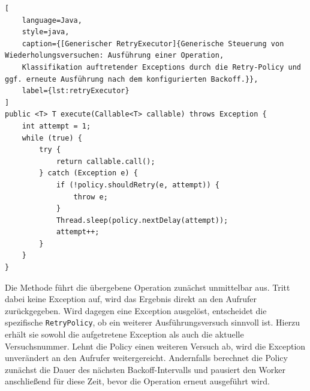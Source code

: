 \begin{lstlisting}[
    language=Java,
    style=java,
    caption={[Generischer RetryExecutor]{Generische Steuerung von Wiederholungsversuchen: Ausführung einer Operation,
    Klassifikation auftretender Exceptions durch die Retry-Policy und ggf. erneute Ausführung nach dem konfigurierten Backoff.}},
    label={lst:retryExecutor}
]
public <T> T execute(Callable<T> callable) throws Exception {
    int attempt = 1;
    while (true) {
        try {
            return callable.call();
        } catch (Exception e) {
            if (!policy.shouldRetry(e, attempt)) {
                throw e;
            }
            Thread.sleep(policy.nextDelay(attempt));
            attempt++;
        }
    }
}
\end{lstlisting}

Die Methode führt die übergebene Operation zunächst unmittelbar aus.
Tritt dabei keine Exception auf, wird das Ergebnis direkt an den Aufrufer zurückgegeben.
Wird dagegen eine Exception ausgelöst, entscheidet die spezifische \texttt{RetryPolicy}, ob ein weiterer Ausführungsversuch sinnvoll ist.
Hierzu erhält sie sowohl die aufgetretene Exception als auch die aktuelle Versuchsnummer.
Lehnt die Policy einen weiteren Versuch ab, wird die Exception unverändert an den Aufrufer weitergereicht.
Andernfalls berechnet die Policy zunächst die Dauer des nächsten Backoff-Intervalls und pausiert den Worker anschließend für diese Zeit,
bevor die Operation erneut ausgeführt wird.

